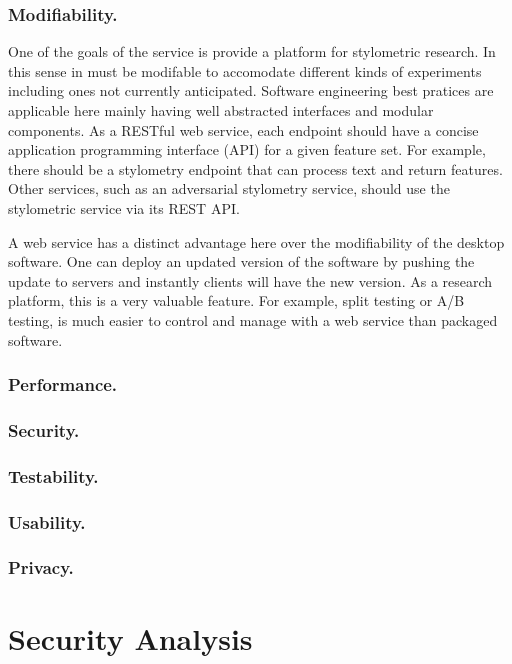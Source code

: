 \documentclass[letterpaper]{article}
\begin{document}
\subsubsection{Modifiability.}

One of the goals of the service is provide a platform for stylometric
research.  In this sense in must be modifable to accomodate different
kinds of experiments including ones not currently anticipated.
Software engineering best pratices are applicable here mainly having
well abstracted interfaces and modular components.  As a RESTful web
service, each endpoint should have a concise application programming
interface (API) for a given feature set.  For example, there should be
a stylometry endpoint that can process text and return features.
Other services, such as an adversarial stylometry service, should use
the stylometric service via its REST API.

A web service has a distinct advantage here over the modifiability of
the desktop software.  One can deploy an updated version of the
software by pushing the update to servers and instantly clients will
have the new version.  As a research platform, this is a very valuable
feature.  For example, split testing or A/B testing, is much easier to
control and manage with a web service than packaged software.

\subsubsection{Performance.}

\subsubsection{Security.}


\subsubsection{Testability.}


\subsubsection{Usability.}

\subsubsection{Privacy.}


\section{Security Analysis}
\end{document}
